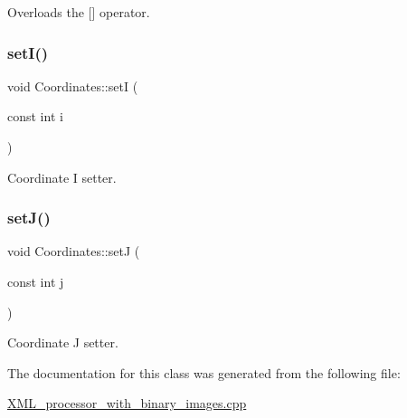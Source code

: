 Overloads the \mbox{[}\mbox{]} operator. 

\mbox{\label{class_coordinates_aff6e2b2340430c5b5f0ba24a987c99a2}} 
\subsubsection{\texorpdfstring{set\+I()}{setI()}}
{\footnotesize\ttfamily void Coordinates\+::setI (\begin{DoxyParamCaption}\item[{const int}]{i }\end{DoxyParamCaption})\hspace{0.3cm}{\ttfamily [inline]}}



Coordinate I setter. 

\mbox{\label{class_coordinates_a3e0fb7ab12e0781ad4544a9c8b91edb4}} 
\subsubsection{\texorpdfstring{set\+J()}{setJ()}}
{\footnotesize\ttfamily void Coordinates\+::setJ (\begin{DoxyParamCaption}\item[{const int}]{j }\end{DoxyParamCaption})\hspace{0.3cm}{\ttfamily [inline]}}



Coordinate J setter. 



The documentation for this class was generated from the following file\+:\begin{DoxyCompactItemize}
\item 
\mbox{\hyperlink{_x_m_l__processor__with__binary__images_8cpp}{X\+M\+L\+\_\+processor\+\_\+with\+\_\+binary\+\_\+images.\+cpp}}\end{DoxyCompactItemize}
